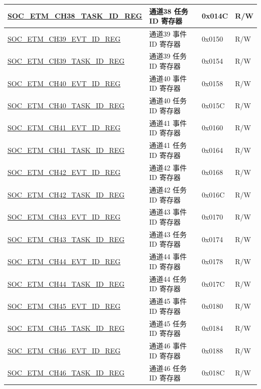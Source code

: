 \begin{longtable}{ | p{6cm} | p{6.2cm} | p{1.3cm} | p{2cm} | }
\hyperref[regdesc:SOCETMCH0TASKIDREG]{SOC\_ETM\_CH38\_TASK\_ID\_REG} & 通道38 任务 ID 寄存器 & 0x014C & R/W \\ \hline
\hyperref[regdesc:SOCETMCH0EVTIDREG]{SOC\_ETM\_CH39\_EVT\_ID\_REG} & 通道39 事件 ID 寄存器 & 0x0150 & R/W \\ \hline
\hyperref[regdesc:SOCETMCH0TASKIDREG]{SOC\_ETM\_CH39\_TASK\_ID\_REG} & 通道39 任务 ID 寄存器 & 0x0154 & R/W \\ \hline
\hyperref[regdesc:SOCETMCH0EVTIDREG]{SOC\_ETM\_CH40\_EVT\_ID\_REG} & 通道40 事件 ID 寄存器 & 0x0158 & R/W \\ \hline
\hyperref[regdesc:SOCETMCH0TASKIDREG]{SOC\_ETM\_CH40\_TASK\_ID\_REG} & 通道40 任务 ID 寄存器 & 0x015C & R/W \\ \hline
\hyperref[regdesc:SOCETMCH0EVTIDREG]{SOC\_ETM\_CH41\_EVT\_ID\_REG} & 通道41 事件 ID 寄存器 & 0x0160 & R/W \\ \hline
\hyperref[regdesc:SOCETMCH0TASKIDREG]{SOC\_ETM\_CH41\_TASK\_ID\_REG} & 通道41 任务 ID 寄存器 & 0x0164 & R/W \\ \hline
\hyperref[regdesc:SOCETMCH0EVTIDREG]{SOC\_ETM\_CH42\_EVT\_ID\_REG} & 通道42 事件 ID 寄存器 & 0x0168 & R/W \\ \hline
\hyperref[regdesc:SOCETMCH0TASKIDREG]{SOC\_ETM\_CH42\_TASK\_ID\_REG} & 通道42 任务 ID 寄存器 & 0x016C & R/W \\ \hline
\hyperref[regdesc:SOCETMCH0EVTIDREG]{SOC\_ETM\_CH43\_EVT\_ID\_REG} & 通道43 事件 ID 寄存器 & 0x0170 & R/W \\ \hline
\hyperref[regdesc:SOCETMCH0TASKIDREG]{SOC\_ETM\_CH43\_TASK\_ID\_REG} & 通道43 任务 ID 寄存器 & 0x0174 & R/W \\ \hline
\hyperref[regdesc:SOCETMCH0EVTIDREG]{SOC\_ETM\_CH44\_EVT\_ID\_REG} & 通道44 事件 ID 寄存器 & 0x0178 & R/W \\ \hline
\hyperref[regdesc:SOCETMCH0TASKIDREG]{SOC\_ETM\_CH44\_TASK\_ID\_REG} & 通道44 任务 ID 寄存器 & 0x017C & R/W \\ \hline
\hyperref[regdesc:SOCETMCH0EVTIDREG]{SOC\_ETM\_CH45\_EVT\_ID\_REG} & 通道45 事件 ID 寄存器 & 0x0180 & R/W \\ \hline
\hyperref[regdesc:SOCETMCH0TASKIDREG]{SOC\_ETM\_CH45\_TASK\_ID\_REG} & 通道45 任务 ID 寄存器 & 0x0184 & R/W \\ \hline
\hyperref[regdesc:SOCETMCH0EVTIDREG]{SOC\_ETM\_CH46\_EVT\_ID\_REG} & 通道46 事件 ID 寄存器 & 0x0188 & R/W \\ \hline
\hyperref[regdesc:SOCETMCH0TASKIDREG]{SOC\_ETM\_CH46\_TASK\_ID\_REG} & 通道46 任务 ID 寄存器 & 0x018C & R/W \\ \hline

\end{longtable}
